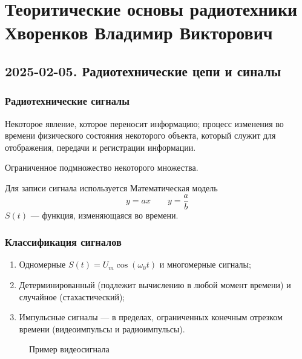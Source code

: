 \part[Теоритические основы радиотехники]{
Теоритические основы радиотехники \\
{\Large Хворенков Владимир Викторович}
}

\chapter{2025-02-05. Радиотехнические цепи и синалы}

\section{Радиотехнические сигналы}

\begin{definition}[Сигнал]
	Некоторое явление, которое переносит информацию; процесс изменения во времени
	физического состояния некоторого объекта, который служит для отображения,
	передачи и регистрации информации.
\end{definition}

\begin{definition}[Кластер]
	Ограниченное подмножество некоторого множества.
\end{definition}

Для записи сигнала используется Математическая модель
\[ y = ax \qquad y = \frac{a}{b} \]
$S(t)$ --- функция, изменяющаяся во времени.

\section{Классификация сигналов}

\begin{enumerate}
	\item Одномерные $S(t) = U_m \cos (\omega_0 t)$ и многомерные сигналы;
	\item Детерминированный (подлежит вычислению в любой момент времени) и
	      случайное (стахастический);
	\item Импульсные сигналы --- в пределах, ограниченных конечным отрезком
	      времени (видеоимпульсы и радиоимпульсы).
\end{enumerate}

\begin{figure}[!htbp]
	\centering
	\caption{Пример видеосигнала}\label{fig:video-signal}
\end{figure}
